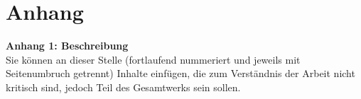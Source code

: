 \appendix

\section{Anhang}
\label{sec:anhang}

\large\textbf{Anhang 1: Beschreibung}\\
\normalsize
Sie können an dieser Stelle (fortlaufend nummeriert und jeweils mit Seitenumbruch getrennt) Inhalte einfügen, die zum Verständnis der Arbeit nicht kritisch sind, jedoch Teil des Gesamtwerks sein sollen.





